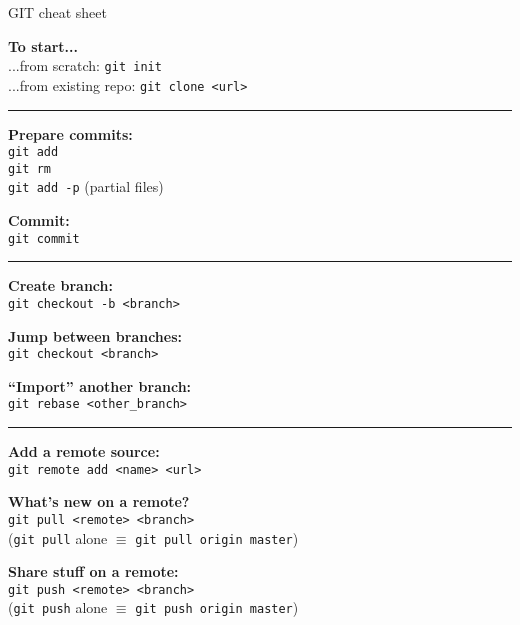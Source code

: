 \documentclass[compress]{beamer}
\begin{document}
\begin{frame}{GIT cheat sheet}
\scriptsize
    \begin{multicols}{2}

    {\bf To start...}\\
    ...from scratch: \texttt{git init}\\
    ...from existing repo: \texttt{git clone <url>}\par

    \rule{\columnwidth}{0.2pt}

    {\bf Prepare commits:}\\
    \texttt{git add}\\
    \texttt{git rm}\\
    \texttt{git add -p} (partial files)\par

    {\bf Commit:}\\
    \texttt{git commit}\par

    \rule{\columnwidth}{0.2pt}

    {\bf Create branch:}\\
    \texttt{git checkout -b <branch>}\par

    {\bf Jump between branches:}\\
    \texttt{git checkout <branch>}\par

    {\bf ``Import'' another branch:}\\
    \texttt{git rebase <other\_branch>}\par

    \rule{\columnwidth}{0.2pt}

    {\bf Add a remote source:}\\
    \texttt{git remote add <name> <url>}\par

    {\bf What's new on a remote?}\\
    \texttt{git pull <remote> <branch>}\\
    {\tiny (\texttt{git pull} alone $\equiv$ \texttt{git pull origin master})}\par

    {\bf Share stuff on a remote:}\\
    \texttt{git push <remote> <branch>}\\
    {\tiny (\texttt{git push} alone $\equiv$ \texttt{git push origin master})}\par


\end{multicols}
\end{frame}
\end{document}
